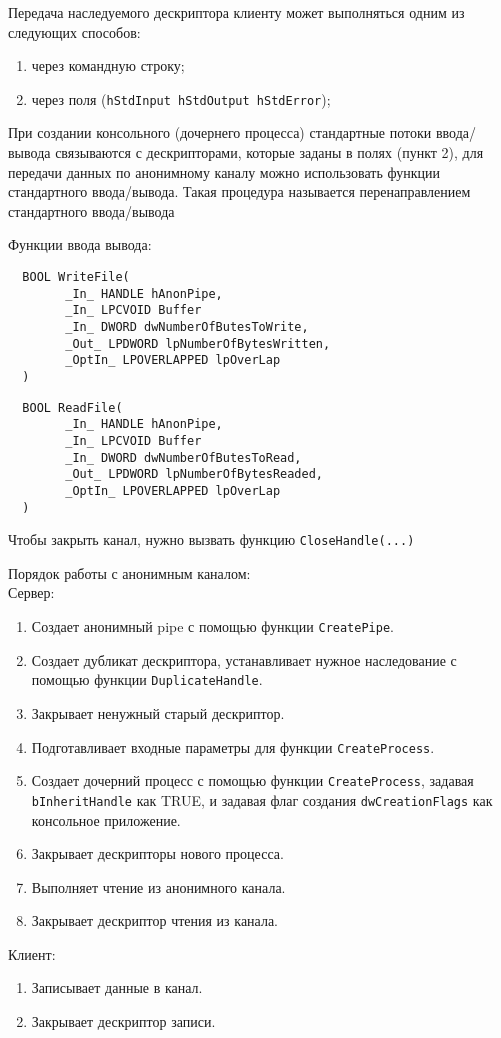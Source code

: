 Передача наследуемого дескриптора клиенту может выполняться одним из следующих
способов: 
\begin{enumerate}
  \item через командную строку;
  \item через поля (\verb!hStdInput hStdOutput hStdError!);
\end{enumerate}

При создании консольного (дочернего процесса) стандартные потоки ввода/вывода
связываются с дескрипторами, которые заданы в полях (пункт 2), для передачи
данных по анонимному каналу можно использовать функции стандартного
ввода/вывода. Такая процедура называется перенаправлением стандартного
ввода/вывода

Функции ввода вывода:
\begin{verbatim}
  BOOL WriteFile(
        _In_ HANDLE hAnonPipe,
        _In_ LPCVOID Buffer
        _In_ DWORD dwNumberOfButesToWrite,
        _Out_ LPDWORD lpNumberOfBytesWritten,
        _OptIn_ LPOVERLAPPED lpOverLap
  )
\end{verbatim}

\begin{verbatim}
  BOOL ReadFile(
        _In_ HANDLE hAnonPipe,
        _In_ LPCVOID Buffer
        _In_ DWORD dwNumberOfButesToRead,
        _Out_ LPDWORD lpNumberOfBytesReaded,
        _OptIn_ LPOVERLAPPED lpOverLap
  )
\end{verbatim}

Чтобы закрыть канал, нужно вызвать функцию \verb!CloseHandle(...)!

Порядок работы с анонимным каналом:\\
Сервер:
\begin{enumerate}
  \item Создает анонимный pipe с помощью функции \verb!CreatePipe!.
  \item Создает дубликат дескриптора, устанавливает нужное наследование с
    помощью функции \verb!DuplicateHandle!.
  \item Закрывает ненужный старый дескриптор.
  \item Подготавливает входные параметры для функции \verb!CreateProcess!.
  \item Создает дочерний процесс с помощью функции \verb!CreateProcess!, задавая
    \verb!bInheritHandle! как TRUE, и задавая флаг создания
    \verb!dwCreationFlags! как консольное приложение.
  \item Закрывает дескрипторы нового процесса.
  \item Выполняет чтение из анонимного канала.
  \item Закрывает дескриптор чтения из канала.
\end{enumerate}
Клиент:
\begin{enumerate}
  \item Записывает данные в канал.
  \item Закрывает дескриптор записи.
\end{enumerate}

